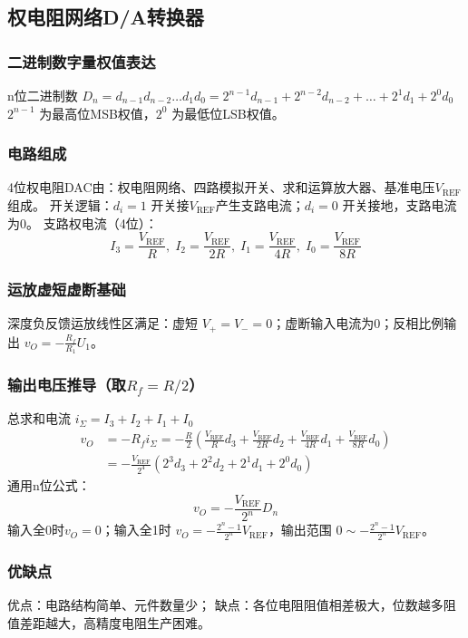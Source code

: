 \subsection{权电阻网络D/A转换器}
\subsubsection{二进制数字量权值表达}
n位二进制数 $D_n = d_{n-1}d_{n-2}\dots d_1d_0 = 2^{n-1}d_{n-1}+2^{n-2}d_{n-2}+\dots+2^1d_1+2^0d_0$
$2^{n-1}$ 为最高位MSB权值，$2^0$ 为最低位LSB权值。

\subsubsection{电路组成}
4位权电阻DAC由：权电阻网络、四路模拟开关、求和运算放大器、基准电压$V_\text{REF}$组成。
开关逻辑：$d_i=1$ 开关接$V_\text{REF}$产生支路电流；$d_i=0$ 开关接地，支路电流为0。
支路权电流（4位）：
\[
I_3=\frac{V_\text{REF}}{R},\; I_2=\frac{V_\text{REF}}{2R},\; I_1=\frac{V_\text{REF}}{4R},\; I_0=\frac{V_\text{REF}}{8R}
\]

\subsubsection{运放虚短虚断基础}
深度负反馈运放线性区满足：虚短 $V_+=V_-=0$；虚断输入电流为0；反相比例输出 $v_O = -\frac{R_f}{R_1}U_1$。

\subsubsection{输出电压推导（取$R_f=R/2$）}
总求和电流 $i_\Sigma = I_3+I_2+I_1+I_0$
\[
\begin{aligned}
v_O &= -R_f i_\Sigma
= -\frac{R}{2}\left( \frac{V_\text{REF}}{R}d_3+\frac{V_\text{REF}}{2R}d_2+\frac{V_\text{REF}}{4R}d_1+\frac{V_\text{REF}}{8R}d_0 \right) \\
&= -\frac{V_\text{REF}}{2^4}\left(2^3d_3+2^2d_2+2^1d_1+2^0d_0\right)
\end{aligned}
\]
通用n位公式：
\[
v_O = -\frac{V_\text{REF}}{2^n} D_n
\]
输入全0时$v_O=0$；输入全1时 $v_O=-\frac{2^n-1}{2^n}V_\text{REF}$，输出范围 $0 \sim -\frac{2^n-1}{2^n}V_\text{REF}$。

\subsubsection{优缺点}
优点：电路结构简单、元件数量少；
缺点：各位电阻阻值相差极大，位数越多阻值差距越大，高精度电阻生产困难。

